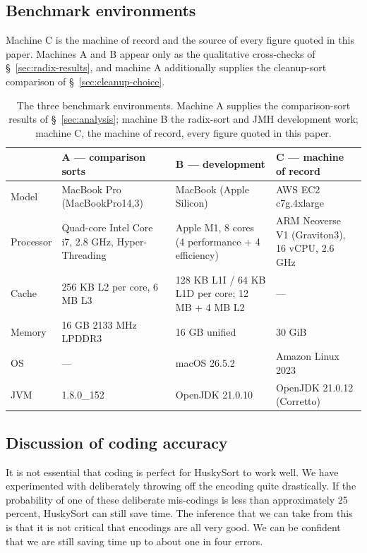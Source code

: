 \documentclass[twoside,leqno,twocolumn]{article}
\begin{document}
\subsection{Benchmark environments}
\label{sec:environments}

Machine C is the machine of record and the source of every figure quoted in this paper.
Machines A and B appear only as the qualitative cross-checks of \S~\ref{sec:radix-results}, and
machine A additionally supplies the cleanup-sort comparison of \S~\ref{sec:cleanup-choice}.

\begin{table}
  \caption{The three benchmark environments. Machine A supplies the comparison-sort results of
    \S~\ref{sec:analysis}; machine B the radix-sort and JMH development work; machine C, the machine
    of record, every figure quoted in this paper.}
  \label{tab:SysEnv}
  \begin{tabularx}{\linewidth}{lXXX}
    \toprule
    & \textbf{A} --- comparison sorts & \textbf{B} --- development & \textbf{C} --- machine of record \\
    \midrule
    Model & MacBook Pro (MacBookPro14,3) & MacBook (Apple Silicon) & AWS EC2 c7g.4xlarge \\
    Processor & Quad-core Intel Core i7, 2.8 GHz, Hyper-Threading & Apple M1, 8 cores (4 performance + 4 efficiency) & ARM Neoverse V1 (Graviton3), 16 vCPU, 2.6 GHz \\
    Cache & 256 KB L2 per core, 6 MB L3 & 128 KB L1I / 64 KB L1D per core; 12 MB + 4 MB L2 & --- \\
    Memory & 16 GB 2133 MHz LPDDR3 & 16 GB unified & 30 GiB \\
    OS & --- & macOS 26.5.2 & Amazon Linux 2023 \\
    JVM & 1.8.0\_152 & OpenJDK 21.0.10 & OpenJDK 21.0.12 (Corretto) \\
    \bottomrule
  \end{tabularx}
\end{table}

\subsection{Discussion of coding accuracy}
It is not essential that coding is perfect for HuskySort to work well.
We have experimented with deliberately throwing off the encoding quite drastically.
If the probability of one of these deliberate mis-codings is less than approximately 25 percent, HuskySort can still save time.
The inference that we can take from this is that it is not critical that encodings are all very good.
We can be confident that we are still saving time up to about one in four errors.
\end{document}
